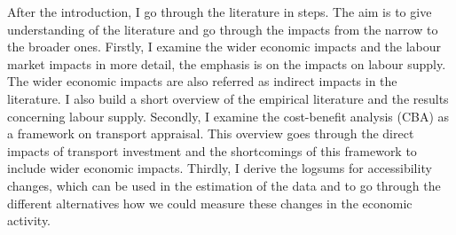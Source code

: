 After the introduction, I go through the literature in steps. The aim is to give understanding of the literature and go through the impacts from the narrow to the broader ones.  Firstly, I examine the wider economic impacts and the labour market impacts in more detail, the emphasis is on the impacts on labour supply. The wider economic impacts are also referred as indirect impacts in the literature. I also build a short overview of the empirical literature and the results concerning labour supply. Secondly, I examine the cost-benefit analysis (CBA) as a framework on transport appraisal. This overview goes through the direct impacts of transport investment and the shortcomings of this framework to include wider economic impacts. Thirdly, I derive the logsums for accessibility changes, which can be used in the estimation of the data and to go through the different alternatives how we could measure these changes in the economic activity. \\

